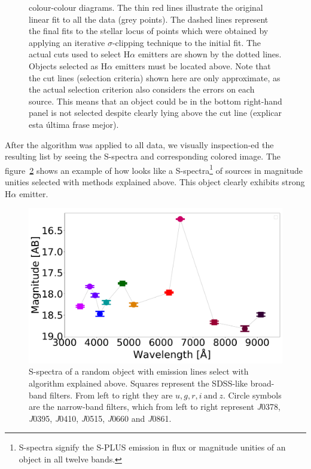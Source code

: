 \documentclass[fleqn,usenatbib]{mnras}
\begin{document}
\begin{figure}
{    colour-colour diagrams. The thin red lines illustrate the original linear
    fit to all the data (grey points). The dashed lines represent the final
    fits to the stellar locus of points which were obtained by applying an iterative
    $\sigma$-clipping technique to the initial fit. The actual cuts used to select
    H{$\alpha$} emitters are shown by the dotted lines. Objects selected as H{$\alpha$}
    emitters must be located above. Note that the cut lines (selection criteria) shown
    here are only approximate, as the actual selection criterion also considers the
    errors on each source. This means that an object could be in the bottom
    right-hand panel is not selected despite clearly lying above the cut line
    ({\sc explicar esta última frase mejor}).}
  \label{fig:criteria-color-plot}
\end{figure}

After the algorithm was applied to all data, we visually inspection-ed the
resulting list by seeing the S-spectra and corresponding colored image.
The figure~\ref{fig:Spectra} shows an example of how looks like a
S-spectra\footnote{S-spectra signify the S-PLUS emission in flux
or magnitude unities of an object in all twelve bands.} of sources in
magnitude unities selected with methods explained above. This object
clearly exhibits strong H$\alpha$ emitter.

\begin{figure}
\includegraphics[width=0.9\linewidth]{Figs/photopectrum_splus_HYDRA-0026-052331_Good-LD-Halpha-DR3_noFlag_merge-takeoutbad-Final_PStotal.pdf}
\centering
{}
\caption{S-spectra of a random object with emission lines select with algorithm explained
  above. Squares represent the SDSS-like broad-band filters. From left to right 
  they are \(u, g, r, i~\text{and}~ z\). Circle symbols are the narrow-band filters,
  which from left to right represent \textit{J}0378, \textit{J}0395, \textit{J}0410,
  \textit{J}0515, \textit{J}0660 and \textit{J}0861.}
\label{fig:Spectra}
\end{figure}
\end{document}
